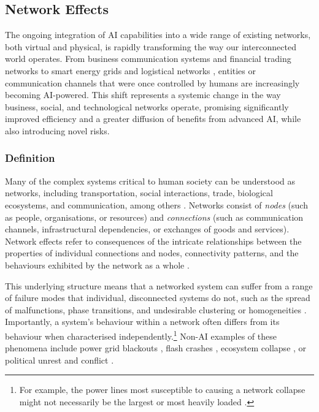 \subsection{Network Effects}
\label{sec:network_effects}


The ongoing integration of AI capabilities into a wide range of existing networks, both virtual and physical, is rapidly transforming the way our interconnected world operates.
From business communication systems and financial trading networks to smart energy grids and logistical networks \citep{mayorkas2024roles,Camacho2024,Ferreira2021}, entities or communication channels that were once controlled by humans are increasingly becoming AI-powered.
This shift represents a systemic change in the way business, social, and technological networks operate, promising significantly improved efficiency and a greater diffusion of benefits from advanced AI, while also introducing novel risks.

\subsubsection{Definition}


Many of the complex systems critical to human society can be understood as networks, including transportation, social interactions, trade, biological ecosystems, and communication, among others \citep{barabasi2016network,newman_networks_2018,jackson_chapter_2015}.
Networks consist of \textit{nodes} (such as people, organisations, or resources) and \textit{connections} (such as communication channels, infrastructural dependencies, or exchanges of goods and services). 
Network effects refer to consequences of the intricate relationships between the properties of individual connections and nodes, connectivity patterns, and the behaviours exhibited by the network as a whole \citep{siegenfeld2020introduction}.

This underlying structure means that a networked system can suffer from a range of failure modes that individual, disconnected systems do not, such as the spread of malfunctions, phase transitions, and undesirable clustering or homogeneities \citep{cohen2010complex}.
Importantly, a system's behaviour within a network often differs from its behaviour when characterised independently.\footnote{For example, the power lines most susceptible to causing a network collapse might not necessarily be the largest or most heavily loaded \citep{buldyrev2010catastrophic}.}
Non-AI examples of these phenomena include power grid blackouts \citep{buldyrev2010catastrophic,SHAKARIAN2013209}, flash crashes \citep[see also ]{paulin2019understanding,elliott_financial_2014}, ecosystem collapse \citep{bascompte2009assembly,gao2016universal}, or political unrest and conflict \citep{wood2008social,forsberg2008polarization}.

